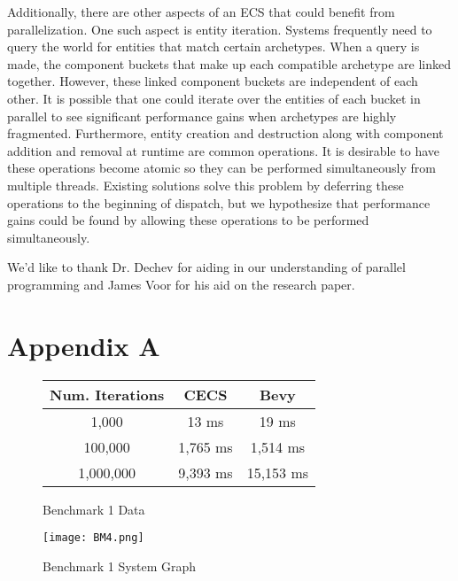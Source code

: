 \documentclass[conference]{IEEEtran}
\begin{document}
Additionally, there are other aspects of an ECS that could benefit from parallelization. One such aspect is entity iteration. Systems frequently need to query the world for entities that match certain archetypes. When a query is made, the component buckets that make up each compatible archetype are linked together. However, these linked component buckets are independent of each other. It is possible that one could iterate over the entities of each bucket in parallel to see significant performance gains when archetypes are highly fragmented. Furthermore, entity creation and destruction along with component addition and removal at runtime are common operations. It is desirable to have these operations become atomic so they can be performed simultaneously from multiple threads. Existing solutions solve this problem by deferring these operations to the beginning of dispatch, but we hypothesize that performance gains could be found by allowing these operations to be performed simultaneously.

We'd like to thank Dr. Dechev for aiding in our understanding of parallel programming and James Voor for his aid on the research paper.

 


\section{Appendix A}

\begin{figure}[!htb]
    \begin{center}
    
    \begin{tabular}{||c c c||} 
    \hline
    Num. Iterations & CECS & Bevy  \\ [0.5ex] 
    \hline\hline
    1,000 & 13 ms & 19 ms \\ 
    \hline
    100,000 & 1,765 ms & 1,514 ms \\
    \hline
    1,000,000 & 9,393 ms & 15,153 ms \\
    \hline
    \end{tabular}
    
    \caption[test]{Benchmark 1 Data}
    \label{Benchmark 1 Data}
    \end{center}
\end{figure}

\begin{figure}[!htb]
    \begin{center}
    \centerline{\texttt{[image: BM4.png]}}
    \caption[test]{Benchmark 1 System Graph}
    \label{Benchmark 1 System Graph}
    \end{center}
\end{figure}
\end{document}
